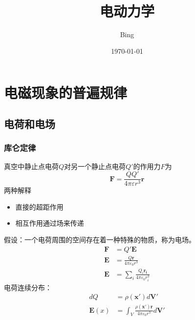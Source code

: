 \documentclass[12pt,a4paper]{ctexart}
\numberwithin{equation}{subsection}
\begin{document}
\title{电动力学}
\author{Bing}
\date{\today}
\maketitle

\tableofcontents  %
\newpage

\section{电磁现象的普遍规律}
\subsection{电荷和电场}
\subsubsection{库仑定律}
真空中静止点电荷$Q$对另一个静止点电荷$Q'$的作用力$F$为
\begin{equation}
\mathbf{F}=\frac{QQ'}{4\pi\varepsilon r^3} \mathbf{r}
\end{equation}
两种解释
\begin{itemize}
    \item 直接的超距作用
    \item 相互作用通过场来传递
\end{itemize}
假设：一个电荷周围的空间存在着一种特殊的物质，称为电场。
\begin{align}
\mathbf{F} &= Q'\mathbf{E} \\
\mathbf{E} &= \frac{Q\mathbf{r}}{4\pi\varepsilon_0 r^3}\\
\mathbf{E} &= \sum_i\frac{Q_i\mathbf{r_i}}{4\pi\varepsilon_0r_i^3}
\end{align}
电荷连续分布：
\begin{equation}
\begin{aligned}
dQ &= \rho(\mathbf{x'})d\mathbf{V'}\\
\mathbf{E}(x) &= \int_V\frac{\rho(\mathbf{x'})\mathbf{r}}{4\pi\varepsilon_0r^3}d\mathbf{V'}
\end{aligned}
\end{equation}
\end{document}
